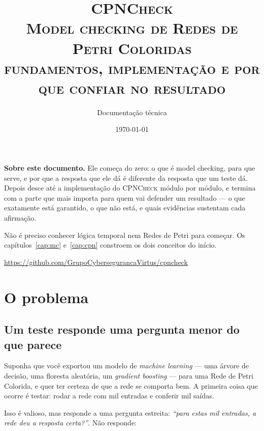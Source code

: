 \documentclass[11pt,a4paper]{report}
\title{\vspace{-1.5cm}\Huge\normalfont\scshape CPNCheck\upshape\\[6pt]
\Large Model checking de Redes de Petri Coloridas\\[4pt]
\large fundamentos, implementação e por que confiar no resultado}
\author{Documentação técnica}
\date{\today}
\newcommand{\cpn}{\textsc{CPNCheck}}
\begin{document}
\maketitle
\thispagestyle{empty}

\vspace{1cm}
\begin{center}
\begin{minipage}{0.82\textwidth}
\small
\noindent\textbf{Sobre este documento.} Ele começa do zero: o que é model
checking, para que serve, e por que a resposta que ele dá é diferente da
resposta que um teste dá. Depois desce até a implementação do \cpn{} módulo
por módulo, e termina com a parte que mais importa para quem vai defender um
resultado --- o que exatamente está garantido, o que não está, e quais
evidências sustentam cada afirmação.

\vspace{6pt}
\noindent Não é preciso conhecer lógica temporal nem Redes de Petri para
começar. Os capítulos~\ref{cap:mc} e~\ref{cap:cpn} constroem os dois conceitos
do início.
\end{minipage}
\end{center}

\vfill
\begin{center}
\small
\url{https://github.com/GrupoCybersegurancaVirtus/cpncheck}
\end{center}

\clearpage
\tableofcontents
\clearpage

\chapter{O problema}

\section{Um teste responde uma pergunta menor do que parece}

Suponha que você exportou um modelo de \emph{machine learning} --- uma árvore
de decisão, uma floresta aleatória, um \emph{gradient boosting} --- para uma
Rede de Petri Colorida, e quer ter certeza de que a rede se comporta bem. A
primeira coisa que ocorre é testar: rodar a rede com mil entradas e conferir
mil saídas.

Isso é valioso, mas responde a uma pergunta estreita: \emph{``para estas mil
entradas, a rede deu a resposta certa?''}. Não responde:
\end{document}
